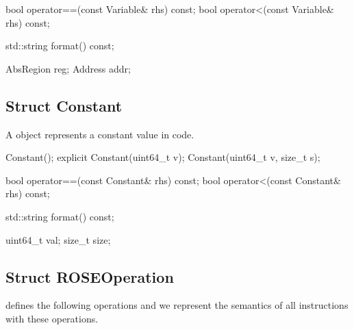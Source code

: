 \begin{apient}
bool operator==(const Variable& rhs) const;
bool operator<(const Variable& rhs) const;
\end{apient}

\begin{apient}
std::string format() const;
\end{apient}

\begin{apient}
AbsRegion reg;
Address addr;
\end{apient}

\subsection{Struct Constant}


A  object represents a constant value in code.

\begin{apient}
Constant();
explicit Constant(uint64_t v);
Constant(uint64_t v, size_t s);
\end{apient}

\begin{apient}
bool operator==(const Constant& rhs) const;
bool operator<(const Constant& rhs) const;
\end{apient}

\begin{apient}
std::string format() const;
\end{apient}

\begin{apient}
uint64_t val;
size_t size;
\end{apient}

\subsection{Struct ROSEOperation}


 defines the following operations and we represent the
semantics of all instructions with these operations.

